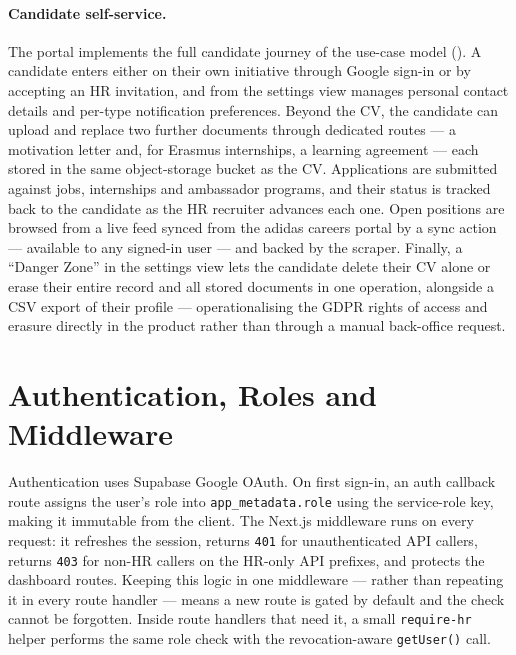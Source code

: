 \paragraph{Candidate self-service.}
The portal implements the full candidate journey of the use-case model
(). A candidate enters either on their own
initiative through Google sign-in or by accepting an HR invitation, and from
the settings view manages personal contact details and per-type notification
preferences. Beyond the CV, the candidate can upload and replace two further
documents through dedicated routes --- a motivation letter and, for Erasmus
internships, a learning agreement --- each stored in the same object-storage
bucket as the CV. Applications are submitted against jobs, internships and
ambassador programs, and their status is tracked back to the candidate as the
HR recruiter advances each one. Open positions are browsed from a live feed
synced from the adidas careers portal by a sync action --- available to any
signed-in user --- and backed by the scraper. Finally, a ``Danger Zone'' in the settings view lets the
candidate delete their CV alone or erase their entire record and all stored
documents in one operation, alongside a CSV export of their profile ---
operationalising the GDPR rights of access and erasure directly in the
product rather than through a manual back-office request.


\section{Authentication, Roles and Middleware}
\label{sec:impl-auth}

Authentication uses Supabase Google OAuth. On first sign-in, an auth callback
route assigns the user's role into \texttt{app\_metadata.role} using the
service-role key, making it immutable from the client. The Next.js middleware
runs on every request: it refreshes the session, returns \texttt{401} for
unauthenticated API callers, returns \texttt{403} for non-HR callers on the
HR-only API prefixes, and protects the dashboard routes. Keeping this logic
in one middleware --- rather than repeating it in every route handler --- means
a new route is gated by default and the check cannot be forgotten. Inside
route handlers that need it, a small \texttt{require-hr} helper performs the
same role check with the revocation-aware \texttt{getUser()} call.

